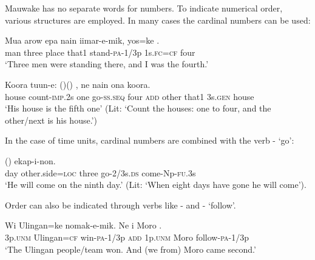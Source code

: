 Mauwake has no separate words for  numbers. To indicate numerical order, various structures are employed. In many cases the cardinal numbers can be used:

\ea%
\label{ex:x96}
\gll Mua arow epa nain iimar-e-mik, yos=ke . \\
man three place that1 stand-\textsc{pa}-1/3p 1s.\textsc{fc}=\textsc{cf} four\\
\glt`Three men were standing there, and I was the fourth.'
\z

\ea%
\label{ex:x428}
\gll Koora tuun-e:  ()\textstyleEmphasizedVernacularWords{-}() , ne   nain ona koora.\\
house count-\textsc{imp}.2s one go-\textsc{ss}.\textsc{seq} four \textsc{add} other that1 3s.\textsc{gen} house\\
\glt`His house is the fifth one' (Lit: `Count the houses: one to four, and the other/next is his house.')
\z

In the case of time units, cardinal numbers are combined with the verb - `go':

\ea%
\label{ex:x427}
\gll {} ()   ekap-i-non. \\
day other.side=\textsc{loc} three go-2/3s.\textsc{ds} come-Np-\textsc{fu}.3s\\
\glt`He will come on the ninth day.' (Lit: `When eight days have gone he will come').
\z

Order can also be indicated through verbs like - and - `follow'. 

\ea%
\label{ex:x98}
\gll Wi Ulingan=ke nomak-e-mik. Ne i Moro .\\
3p.\textsc{unm} Ulingan=\textsc{cf} win-\textsc{pa}-1/3p \textsc{add} 1p.\textsc{unm} Moro follow-\textsc{pa}-1/3p\\
\glt`The Ulingan people/team won. And (we from) Moro came second.'
\z


